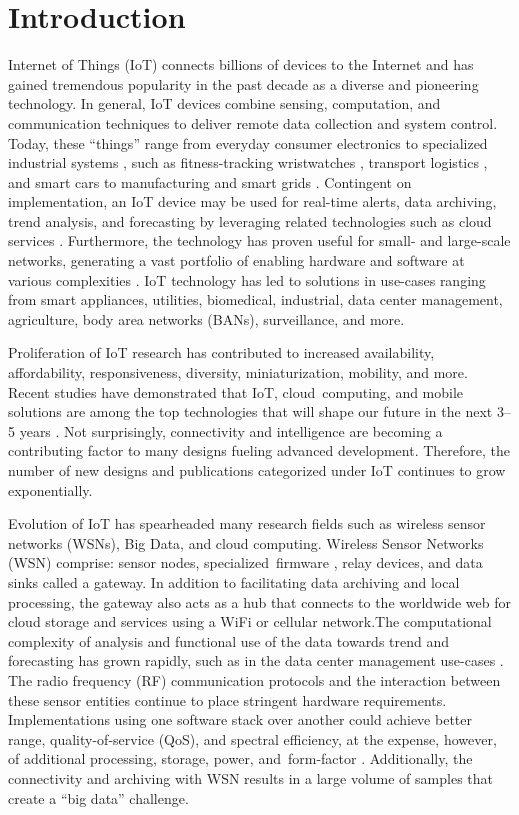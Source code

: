 \documentclass[symmetry,article,accept,moreauthors,pdftex10pt,a4paper]{mdpi}
\begin{document}
\section{Introduction}

Internet of Things (IoT) connects billions of devices to the Internet and has gained tremendous popularity in the past decade as a diverse and pioneering technology. In general, IoT devices combine sensing, computation, and communication techniques to deliver remote data collection and system control. Today, these ``things'' range from everyday consumer electronics to specialized industrial systems \cite{8064227}, such as fitness-tracking wristwatches \cite{Hiremath2015304}, transport logistics \cite{Williams2017a}, and smart cars \cite{Gerla2014241} to manufacturing \cite{Bi20141537} and smart grids \cite{Spano2015468}. Contingent on implementation, an IoT device may be used for real-time alerts, data archiving, trend analysis, and forecasting by leveraging related technologies such as cloud services \cite{ibm2015}. Furthermore, the technology has proven useful for small- and large-scale networks, generating a vast portfolio of enabling hardware and software at various complexities \cite{GARCIASANCHEZ2011288,7172291}. IoT technology has led to solutions in use-cases ranging from smart appliances, utilities, biomedical, industrial, data center management, agriculture, body area networks (BANs), surveillance, and more.

Proliferation of IoT research has contributed to increased availability, affordability, responsiveness, diversity, miniaturization, mobility, and more. Recent studies have demonstrated that IoT, cloud~computing, and mobile solutions are among the top technologies that will shape our future in the next 3--5 years \cite{ibm2015}. Not surprisingly, connectivity and intelligence are becoming a contributing factor to many designs fueling advanced development. Therefore, the number of new designs and publications categorized under IoT continues to grow exponentially.

Evolution of IoT has spearheaded many research fields such as wireless sensor networks (WSNs), Big Data, and cloud computing. Wireless Sensor Networks (WSN) comprise: sensor nodes, specialized~firmware \cite{ruiz2014firmware}, relay devices, and data sinks called a gateway. In addition to facilitating data archiving and local processing, the gateway also acts as a hub that connects to the worldwide web for cloud storage and services using a WiFi or cellular network.The computational complexity of analysis and functional use of the data towards trend and forecasting has grown rapidly, such as in the data center management use-cases \cite{6957004}. The radio frequency (RF) communication protocols and the interaction between these sensor entities continue to place stringent hardware requirements. Implementations using one software stack over another could achieve better range, quality-of-service (QoS), and spectral efficiency, at the expense, however, of additional processing, storage, power, and~form-factor \cite{7172291}. Additionally, the connectivity and archiving with WSN results in a large volume of samples that create a ``big data'' challenge. 
\end{document}
